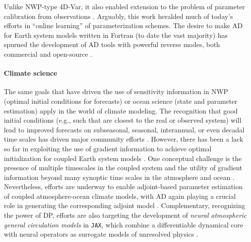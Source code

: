 Unlike NWP-type 4D-Var, it also enabled extension to the problem of parameter calibration from observations \cite{Ferreira.2005,Stammer:2005dw,Liu:2012jd}. 
Arguably, this work heralded much of today's efforts in ``online learning'' of parameterization schemes.
The desire to make AD for Earth system models written in Fortran (to date the vast majority) has  spurned the development of AD tools with powerful reverse modes, both commercial \cite{Giering:1998in,Giering.2006} and open-source \cite{Utke:2008ko,Hascoet.2013,Gaikwad.2023,Gaikwad.2024}.

\paragraph{Climate science}

The same goals that have driven the use of sensitivity information in NWP (optimal initial conditions for forecasts) or ocean science (state and parameter estimation) apply in the world of climate modeling.
The recognition that good initial conditions (e.g., such that are closest to the real or observed system) will lead to improved forecasts on subseasonal, seasonal, interannual, or even decadal time scales has driven major community efforts \cite{Meehl.2021}. 
However, there has been a lack so far in exploiting the use of gradient information to achieve optimal initialization for coupled Earth system models \cite{Frolov.2023}. 
One conceptual challenge is the presence of multiple timescales in the coupled system and the utility of gradient information beyond many synoptic time scales in the atmosphere and ocean \cite{Lea.2000,Lea:2002cv}.
Nevertheless, efforts are underway to enable adjoint-based parameter estimation of coupled atmosphere-ocean climate models, with AD again playing a crucial role in generating the corresponding adjoint model
\cite{Blessing.2014,Lyu.2018,Stammer:2018de}.
Complementary, recognizing the power of DP, efforts are also targeting the development of \textit{neural atmospheric general circulation models} in \texttt{JAX}, which combine a differentiable dynamical core with neural operators as surrogate models of unresolved physics
\cite{Kochkov.2023}.

